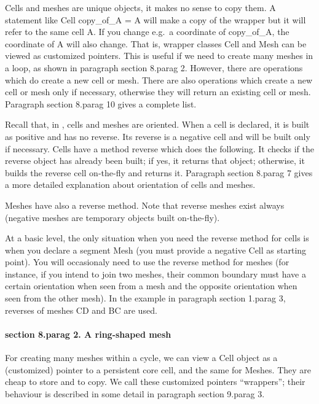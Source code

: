 {Cells and meshes are unique objects, it makes no sense to copy them.
A statement like {\codett Cell copy\_of\_A = A} will make a copy of the wrapper
but it will refer to the same cell {\codett A}.
If you change e.g.\ a coordinate of {\codett copy\_of\_A}, the coordinate of {\codett A}
will also change.
That is, wrapper classes {\codett Cell} and {\codett Mesh} can be viewed as
customized pointers.
This is useful if we need to create many meshes in a loop, as shown in paragraph
\numb section 8.\numb parag 2.
However, there are operations which do create a new cell or mesh.
There are also operations which create a new cell or mesh only if necessary,
otherwise they will return an existing cell or mesh.
Paragraph \numb section 8.\numb parag 10 gives a complete list.

Recall that, in \maniFEM, cells and meshes are oriented.
When a cell is declared, it is built as positive and has no reverse.
Its reverse is a negative cell and will be built only if necessary.
Cells have a method {\codett reverse} which does the following.
It checks if the reverse object has already been built; if yes, it returns that object;
otherwise, it builds the reverse cell on-the-fly and returns it.
Paragraph \numb section 8.\numb parag 7 gives a more detailed explanation about
orientation of cells and meshes.

{\codett Mesh}es have also a {\codett reverse} method.
Note that reverse meshes exist always (negative meshes are temporary objects built
on-the-fly).

At a basic level, the only situation when you need the {\codett reverse} method  for cells is
when you declare a segment {\codett Mesh} (you must provide a negative {\codett Cell} as
starting point).
You will occasionaly need to use the {\codett reverse} method for meshes (for instance, if you
intend to {\codett join} two meshes, their common boundary must have a certain orientation when
seen from a mesh and the opposite orientation when seen from the other mesh).
In the example in paragraph \numb section 1.\numb parag 3,
reverses of meshes {\codett CD} and {\codett BC} are used.


\paragraph{\numb section 8.\numb parag 2. A ring-shaped mesh}

For creating many meshes within a cycle, we can view a {\codett Cell} object as a
(customized) pointer to a persistent core cell, and the same for {\codett Mesh}es.
They are cheap to store and to copy.
We call these customized pointers ``wrappers''; their behaviour is described in some detail in
paragraph \numb section 9.\numb parag 3.

}

